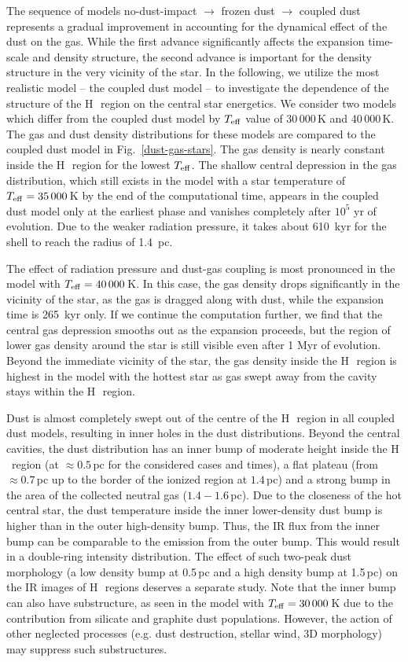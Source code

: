 \documentclass[a4paper,fleqn,usenatbib]{mnras}
\newcommand{\hii}    {H\,{\sc{ii}}~}
\begin{document}
The sequence of models no-dust-impact $\rightarrow$ frozen dust $\rightarrow$ coupled dust represents a gradual improvement in accounting for the dynamical effect of the dust on the gas. While the first advance significantly affects the expansion time-scale and density structure, the second advance is important for the density structure in the very vicinity of the star. In the following, we utilize the most realistic model -- the coupled dust model -- to investigate the dependence of the structure of the \hii region on the central star energetics. We consider two models which differ from the coupled dust model by $T_{\rm eff}$ value of 30\,000\,K and 40\,000\,K. The gas and dust density distributions for these models are compared to the coupled dust model in Fig.~\ref{dust-gas-stars}. The gas density is nearly constant inside the \hii region for the lowest $T_{\rm eff}$. The shallow central depression in the gas distribution, which still exists in the model with a star temperature of $T_{\rm eff}=35\,000$\,K by the end of the computational time, appears in the coupled dust model only at the earliest phase and vanishes completely after $10^5$ yr of evolution. Due to the weaker radiation pressure, it takes about 610~kyr for the shell to reach the radius of 1.4~pc.

The effect of radiation pressure and dust-gas coupling is most pronounced in the model with $T_{\rm eff}=40\,000$\,K. In this case, the gas density drops significantly in the vicinity of the star, as the gas is dragged along with dust, while the expansion time is 265~kyr only. If we continue the computation further, we find that the central gas depression smooths out as the expansion proceeds, but the region of lower gas density around the star is still visible even after 1 Myr of evolution. Beyond the immediate vicinity of the star, the gas density inside the \hii region is highest in the model with the hottest star as gas swept away from the cavity stays within the \hii region.

Dust is almost completely swept out of the centre of the \hii region in all coupled dust models, resulting in inner holes in the dust distributions. Beyond the central cavities, the dust distribution has an inner bump of moderate height inside the \hii region (at $\approx0.5$\,pc for the considered cases and times), a flat plateau (from $\approx0.7$\,pc up to the border of the ionized region at $1.4$\,pc) and a strong bump in the area of the collected neutral gas ($1.4-1.6$\,pc). Due to the closeness of the hot central star, the dust temperature inside the inner lower-density dust bump is higher than in the outer high-density bump. Thus, the IR flux from the inner bump can be comparable to the emission from the outer bump. This would result in a double-ring intensity distribution. The effect of such two-peak dust morphology (a low density bump at 0.5\,pc and a high density bump at 1.5\,pc) on the IR images of \hii regions deserves a separate study. Note that the inner bump can also have substructure, as seen in the model with $T_{\rm eff}=30\,000$\,K due to the contribution from silicate and graphite dust populations. However, the action  of other neglected processes (e.g. dust destruction, stellar wind, 3D morphology) may suppress such substructures. 
\end{document}

